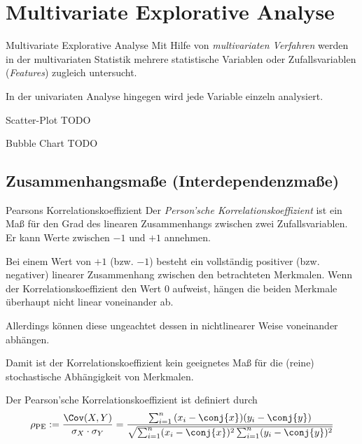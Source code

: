 \section{Multivariate Explorative Analyse}

\begin{defi}{Multivariate Explorative Analyse}
    Mit Hilfe von \emph{multivariaten Verfahren} werden in der multivariaten Statistik mehrere statistische Variablen oder Zufallsvariablen (\emph{Features}) zugleich untersucht.

    In der univariaten Analyse hingegen wird jede Variable einzeln analysiert.
\end{defi}

\begin{defi}{Scatter-Plot}
    TODO
\end{defi}


\begin{defi}{Bubble Chart}
    TODO
\end{defi}

\subsection{Zusammenhangsmaße (Interdependenzmaße)}

\begin{defi}{Pearsons Korrelationskoeffizient}
    Der \emph{Person'sche Korrelationskoeffizient} ist ein Maß für den Grad des linearen Zusammenhangs zwischen zwei Zufallsvariablen.
    Er kann Werte zwischen $-1$ und $+1$ annehmen.

    Bei einem Wert von $+1$ (bzw. $-1$) besteht ein vollständig positiver (bzw. negativer) linearer Zusammenhang zwischen den betrachteten Merkmalen.
    Wenn der Korrelationskoeffizient den Wert $0$ aufweist, hängen die beiden Merkmale überhaupt nicht linear voneinander ab.

    Allerdings können diese ungeachtet dessen in nichtlinearer Weise voneinander abhängen.

    Damit ist der Korrelationskoeffizient kein geeignetes Maß für die (reine) stochastische Abhängigkeit von Merkmalen.

    Der Pearson'sche Korrelationskoeffizient ist definiert durch
    \[
        \rho_{\text{PE}} := \frac{\Cov(X, Y)}{\sigma_X \cdot \sigma_Y} = \frac{\sum_{i=1}^{n}{(x_i - \conj{x})(y_i - \conj{y})}}{\sqrt{\sum_{i=1}^{n}(x_i - \conj{x})^2 \sum_{i=1}^{n}(y_i - \conj{y})^2}}
    \]
\end{defi}

